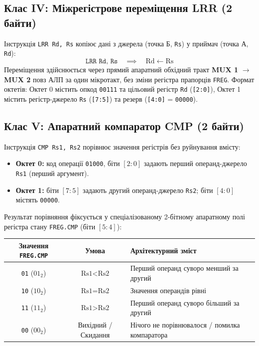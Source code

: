 \documentclass[11pt,a4paper]{article}
\newcommand{\reg}[1]{\texttt{#1}}
\newcommand{\bits}[1]{\texttt{#1}}
\begin{document}
\subsection{Клас IV: Міжрегістрове переміщення LRR (2 байти)}
Інструкція \texttt{LRR Rd, Rs} копіює дані з джерела (точка Б, \reg{Rs}) у приймач (точка А, \reg{Rd}):
$$\texttt{LRR Rd, Rs} \quad \implies \quad \text{Rd} \leftarrow \text{Rs}$$
Переміщення здійснюється через прямий апаратний обхідний тракт \textbf{MUX 1} $\to$ \textbf{MUX 2} повз АЛП за один мікротакт, без зміни регістра прапорців \reg{FREG}. Формат октетів: Октет 0 містить опкод \bits{00111} та цільовий регістр \reg{Rd} (\bits{[2:0]}), Октет 1 містить регістр-джерело \reg{Rs} (\bits{[7:5]}) та резерв (\bits{[4:0]} = \bits{00000}).

\subsection{Клас V: Апаратний компаратор CMP (2 байти)}
Інструкція \texttt{CMP Rs1, Rs2} порівнює значення регістрів без руйнування вмісту:
\begin{itemize}
  \item \textbf{Октет 0:} код операції \bits{01000}, біти $[2:0]$ задають перший операнд-джерело \reg{Rs1} (перший аргумент).
  \item \textbf{Октет 1:} біти $[7:5]$ задають другий операнд-джерело \reg{Rs2}; біти $[4:0]$ містять \bits{00000}.
\end{itemize}
Результат порівняння фіксується у спеціалізованому 2-бітному апаратному полі регістра стану \reg{FREG.CMP} (біти $[5:4]$):
\begin{center}
\begin{tabular}{ccl}
\toprule
Значення \reg{FREG.CMP} & Умова & Архітектурний зміст \\
\midrule
\texttt{01} ($01_2$) & $\text{Rs1} < \text{Rs2}$ & Перший операнд суворо менший за другий \\
\texttt{10} ($10_2$) & $\text{Rs1} = \text{Rs2}$ & Значення операндів рівні \\
\texttt{11} ($11_2$) & $\text{Rs1} > \text{Rs2}$ & Перший операнд суворо більший за другий \\
\texttt{00} ($00_2$) & Вихідний / Скидання & Нічого не порівнювалося / помилка компаратора \\
\bottomrule
\end{tabular}
\end{center}
\end{document}
